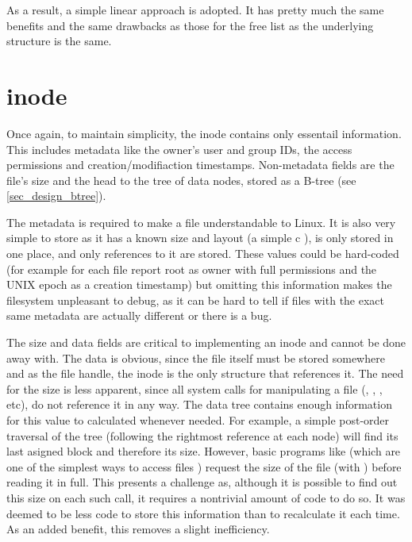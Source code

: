         As a result, a simple linear approach is adopted. It has pretty much
        the same benefits and the same drawbacks as those for the free list as
        the underlying structure is the same.

    \section{inode}

        Once again, to maintain simplicity, the inode contains only essentail
        information. This includes metadata like the owner's user and group
        IDs, the access permissions and creation/modifiaction timestamps.
        Non-metadata fields are the file's size and the head to the tree of
        data nodes, stored as a B-tree (see \ref{sec_design_btree}).

        The metadata is required to make a file understandable to Linux. It is
        also very simple to store as it has a known size and layout (a simple c
        ), is only stored in one place, and only references
        to it are stored. These values could be hard-coded (for example for
        each file report root as owner with full permissions and the UNIX epoch
        as a creation timestamp) but omitting this information makes the
        filesystem unpleasant to debug, as it can be hard to tell if files with
        the exact same metadata are actually different or there is a bug.

        The size and data fields are critical to implementing an inode and
        cannot be done away with. The data is obvious, since the file itself
        must be stored somewhere and as the file handle, the inode is the only
        structure that references it. The need for the size is less apparent,
        since all system calls for manipulating a file (,
        , ,  etc), do not reference
        it in any way. The data tree contains enough information for this value
        to calculated whenever needed. For example, a simple post-order
        traversal of the tree (following the rightmost reference at each node)
        will find its last asigned block and therefore its size. However, basic
        programs like  (which are one of the simplest ways to
        access files \cite{TLDP_proc_access}) request the size of the file
        (with ) before reading it in full. This presents a
        challenge as, although it is possible to find out this size on each
        such call, it requires a nontrivial amount of code to do so. It was
        deemed to be less code to store this information than to recalculate it
        each time. As an added benefit, this removes a slight inefficiency.

